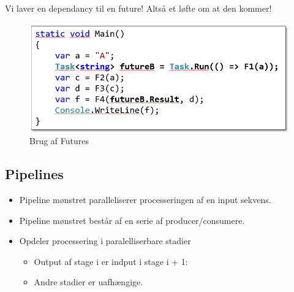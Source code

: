 Vi laver en dependancy til en future! Altså et løfte om at den kommer!

\begin{figure}[H]
	\centering
	\includegraphics[width=0.6\linewidth]{figs/pipeFut/futureB}
	\caption{Brug af Futures}
	\label{fig:FutureEx}
\end{figure}

\subsection{Pipelines}
\begin{itemize}
	\item Pipeline mønstret paralleliserer processeringen af en input sekvens.
	\item Pipeline mønstret består af en serie af producer/consumere.
	\item Opdeler processering i paralelliserbare stadier
	\begin{itemize}
		\item Output af stage i er indput i stage i + 1:
		\item Andre stadier er uafhængige.
	\end{itemize}
\end{itemize}


